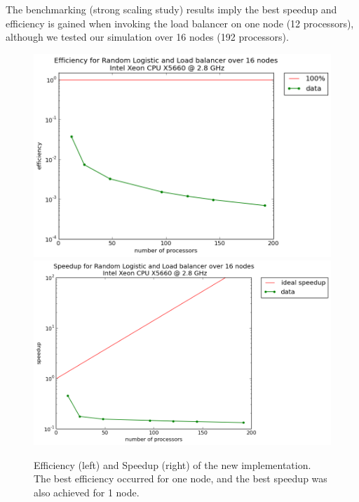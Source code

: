 The benchmarking (strong scaling study) results imply
the best speedup and efficiency is gained when invoking the load balancer on
one node (12 processors), although we tested our simulation over 16 nodes
(192 processors). 
\begin{figure}[!h]
\caption[Impact of the load balancing tool: Efficiency and
Speedup]{Efficiency (left) and Speedup (right) of the new
  implementation. The best efficiency occurred for one node, and the best speedup was also achieved for 1 node.}\label{fig:effsp}
\centering
\includegraphics[width=.5\textwidth]{figs/efficiency_random_logistic.png}\hfill
\includegraphics[width=.5\textwidth]{figs/speedup_random_logistic.png}
\end{figure}